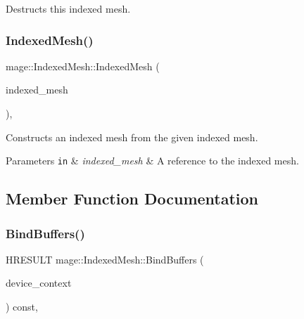 Destructs this indexed mesh. \hypertarget{classmage_1_1_indexed_mesh_a4915cb34541278e14cfd854e6d4b450e}{}\label{classmage_1_1_indexed_mesh_a4915cb34541278e14cfd854e6d4b450e} 
\subsubsection{\texorpdfstring{Indexed\+Mesh()}{IndexedMesh()}\hspace{0.1cm}{\footnotesize\ttfamily [2/2]}}
{\footnotesize\ttfamily mage\+::\+Indexed\+Mesh\+::\+Indexed\+Mesh (\begin{DoxyParamCaption}\item[{const \hyperlink{classmage_1_1_indexed_mesh}{Indexed\+Mesh} \&}]{indexed\+\_\+mesh }\end{DoxyParamCaption})\hspace{0.3cm}{\ttfamily [private]}, {\ttfamily [delete]}}

Constructs an indexed mesh from the given indexed mesh.


\begin{DoxyParams}[1]{Parameters}
\mbox{\tt in}  & {\em indexed\+\_\+mesh} & A reference to the indexed mesh. \\
\hline
\end{DoxyParams}


\subsection{Member Function Documentation}
\hypertarget{classmage_1_1_indexed_mesh_a4043a771a1ffe461cfd876dd62f68212}{}\label{classmage_1_1_indexed_mesh_a4043a771a1ffe461cfd876dd62f68212} 
\subsubsection{\texorpdfstring{Bind\+Buffers()}{BindBuffers()}}
{\footnotesize\ttfamily H\+R\+E\+S\+U\+LT mage\+::\+Indexed\+Mesh\+::\+Bind\+Buffers (\begin{DoxyParamCaption}\item[{\hyperlink{namespacemage_ae74f374780900893caa5555d1031fd79}{Com\+Ptr}$<$ I\+D3\+D11\+Device\+Context2 $>$}]{device\+\_\+context }\end{DoxyParamCaption}) const\hspace{0.3cm}{\ttfamily [override]}, {\ttfamily [virtual]}}



